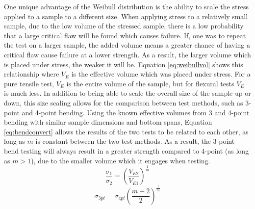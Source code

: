     One unique advantage of the Weibull distribution is the ability to scale the stress applied to a sample to a different size.\cite{Quinn2016}
    When applying stress to a relatively small sample, due to the low volume of the stressed sample, there is a low probability that a large critical flaw will be found which causes failure.
    If, one was to repeat the test on a larger sample, the added volume means a greater chance of having a critical flaw cause failure at a lower strength.
    As a result, the larger volume which is placed under stress, the weaker it will be.
    Equation \ref{eq:weibullvol} shows this relationship where $V_{E}$ is the effective volume which was placed under stress.
    For a pure tensile test, $V_E$ is the entire volume of the sample, but for flexural tests $V_E$ is much less.
    In addition to being able to scale the overall size of the sample up or down, this size scaling allows for the comparison between test methods, such as 3-point and 4-point bending.
    Using the known effective volumes from 3 and 4-point bending with similar sample dimensions and bottom spans, Equation \ref{eq:bendconvert} allows the results of the two tests to be related to each other, as long as $m$ is constant between the two test methods.
    As a result, the 3-point bend testing will always result in a greater strength compared to 4-point (as long as $m > 1$), due to the smaller volume which it engages when testing.
    \begin{equation}
        \label{eq:weibullvol}
        \frac{\sigma_1}{\sigma_2} = \left(\frac{V_{E2}}{V_{E1}}\right)^\frac{1}{m}
    \end{equation}
    \begin{equation}
        \label{eq:bendconvert}
        \sigma_{3pt} = \sigma_{4pt}\left(\frac{m+2}{2}\right)^\frac{1}{m}
    \end{equation}
